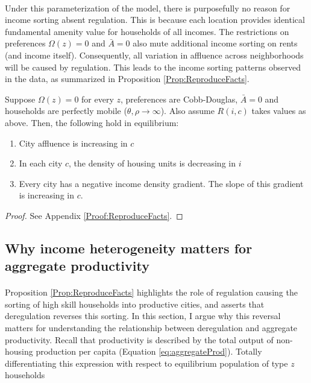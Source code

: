 \documentclass[12pt]{article}
\begin{document}
	\paragraph*{}
	Under this parameterization of the model, there is purposefully no reason for income sorting absent regulation. This is because each location provides identical fundamental amenity value for households of all incomes. The restrictions on preferences $\Omega(z) = 0$ and $\bar{A} = 0$ also mute additional income sorting on rents (and income itself).  Consequently, all variation in affluence across neighborhoods will be caused by regulation. This leads to the income sorting patterns observed in the data, as summarized in Proposition \ref{Prop:ReproduceFacts}.
	\begin{Proposition}\label{Prop:ReproduceFacts}
	Suppose $\Omega(z) = 0$ for every $z$, preferences are Cobb-Douglas, $\bar{A} = 0$ and households are perfectly mobile ($\theta, \rho \to \infty$). Also assume $R(i, c)$ takes values as above. Then, the following hold in equilibrium:
	
		\begin{enumerate}
			\item City affluence is increasing in $c$
		
			\item In each city $c$, the density of housing units is decreasing in $i$ 
		
			\item Every city has a negative income density gradient. The slope of this gradient is increasing in $c$.
		\end{enumerate}
	
	\end{Proposition}
	\begin{proof}
		See Appendix \ref{Proof:ReproduceFacts}.
	\end{proof}
	
	
	
\subsection{Why income heterogeneity matters for aggregate productivity}
\paragraph*{}
Proposition \ref{Prop:ReproduceFacts} highlights the role of regulation causing the sorting of high skill households into productive cities, and asserts that deregulation reverses this sorting. In this section, I argue why this reversal matters for understanding the relationship between deregulation and aggregate productivity. Recall that productivity is described by the total output of non-housing production per capita (Equation \ref{eq:aggregateProd}). Totally differentiating this expression with respect to equilibrium population of type $z$ households
\end{document}
